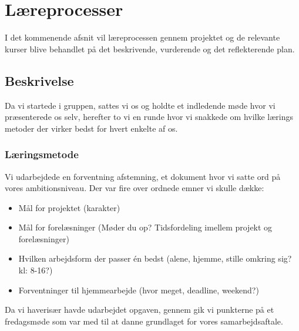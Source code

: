 \chapter{Læreprocesser}
I det kommenende afsnit vil læreprocessen gennem projektet og de relevante kurser blive behandlet på det beskrivende, vurderende og det reflekterende plan. 
\section{Beskrivelse}
Da vi startede i gruppen, sattes vi os og holdte et indledende møde hvor vi præsenterede os selv, herefter to vi en runde hvor vi snakkede om hvilke lærings metoder der virker bedst for hvert enkelte af os.
\subsection{Læringsmetode}
 Vi udarbejdede en  forventning afstemning, et dokument hvor vi satte ord på vores ambitionsniveau. Der var fire over ordnede emner vi skulle dække:

\begin{itemize}
	\item Mål for projektet (karakter)
	\item Mål for forelæsninger (Møder du op? Tidsfordeling imellem projekt og forelæsninger)
	\item Hvilken arbejdsform der passer én bedst (alene, hjemme, stille omkring sig? kl: 8-16?)
	\item Forventninger til hjemmearbejde (hvor meget, deadline, weekend?)
\end{itemize}
Da vi haverisær havde udarbejdet opgaven, gennem gik vi punkterne på et fredagsmøde som var med til at danne grundlaget for vores samarbejdsaftale.  

